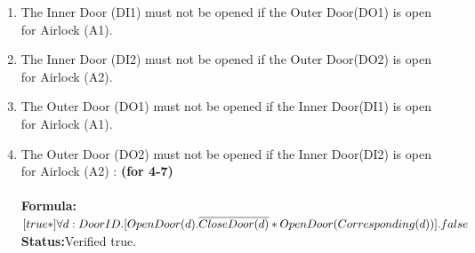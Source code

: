 \documentclass[a4paper,12pt]{article}
\begin{document}
\begin{enumerate}






\item The Inner Door (DI1) must not be opened if the Outer Door(DO1) is open for Airlock (A1).


\item The Inner Door (DI2) must not be opened if the Outer Door(DO2) is open for Airlock (A2).


\item The Outer Door (DO1) must not be opened if the Inner Door(DI1) is open for Airlock (A1).


\item The Outer Door (DO2) must not be opened if the Inner Door(DI2) is open for Airlock (A2) : \textbf{(for 4-7)} 
\\
\\\textbf{Formula:} $[true*] \forall d: DoorID.[OpenDoor(d).\overline{CloseDoor(d)}*
\\OpenDoor(Corresponding(d))].false$ 
\\\textbf{Status:}Verified true.



\end{enumerate}
\end{document}
